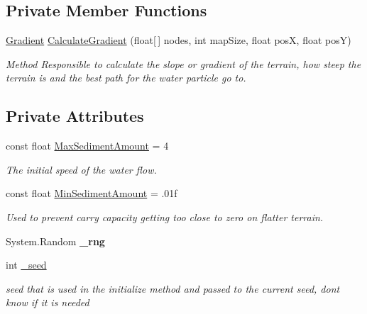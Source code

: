 \subsection*{Private Member Functions}
\begin{DoxyCompactItemize}
\item 
\mbox{\hyperlink{struct_assets_1_1_scripts_1_1_gradient}{Gradient}} \mbox{\hyperlink{class_assets_1_1_scripts_1_1_erosion_a7c26866a0dce3f28f17e8736c0e8e968}{Calculate\+Gradient}} (float\mbox{[}$\,$\mbox{]} nodes, int map\+Size, float posX, float posY)
\begin{DoxyCompactList}\small\item\em Method Responsible to calculate the slope or gradient of the terrain, how steep the terrain is and the best path for the water particle go to. \end{DoxyCompactList}\end{DoxyCompactItemize}
\subsection*{Private Attributes}
\begin{DoxyCompactItemize}
\item 
const float \mbox{\hyperlink{class_assets_1_1_scripts_1_1_erosion_a2fd2d7a586583b867495c96570f27f6b}{Max\+Sediment\+Amount}} = 4
\begin{DoxyCompactList}\small\item\em The initial speed of the water flow. \end{DoxyCompactList}\item 
\mbox{\label{class_assets_1_1_scripts_1_1_erosion_aedca88fa942fd3f1d2dc7a7cc3c721db}} 
const float \mbox{\hyperlink{class_assets_1_1_scripts_1_1_erosion_aedca88fa942fd3f1d2dc7a7cc3c721db}{Min\+Sediment\+Amount}} = .\+01f
\begin{DoxyCompactList}\small\item\em Used to prevent carry capacity getting too close to zero on flatter terrain. \end{DoxyCompactList}\item 
\mbox{\label{class_assets_1_1_scripts_1_1_erosion_af598a320566103384924f9f2500204ac}} 
System.\+Random {\bfseries \+\_\+rng}
\item 
\mbox{\label{class_assets_1_1_scripts_1_1_erosion_a7e37675e7d5a2fa8422fa2409bf37e21}} 
int \mbox{\hyperlink{class_assets_1_1_scripts_1_1_erosion_a7e37675e7d5a2fa8422fa2409bf37e21}{\+\_\+seed}}
\begin{DoxyCompactList}\small\item\em seed that is used in the initialize method and passed to the current seed, don\textquotesingle{}t know if it is needed \end{DoxyCompactList}\end{DoxyCompactItemize}


